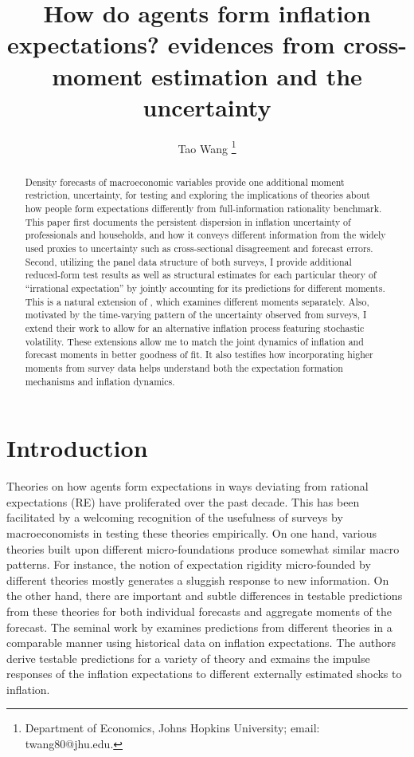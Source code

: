 \documentclass[12pt]{article}
\title{How do agents form inflation expectations? evidences from cross-moment estimation and the uncertainty}
\author{Tao Wang \footnote{Department of Economics, Johns Hopkins University; email: twang80@jhu.edu. }}
\begin{document}
	
	\maketitle
	
	\begin{abstract}
	Density forecasts of macroeconomic variables provide one additional moment restriction, uncertainty, for testing and exploring the implications of theories about how people form expectations differently from full-information rationality benchmark. This paper first documents the persistent dispersion in inflation uncertainty of professionals and households, and how it conveys different information from the widely used proxies to uncertainty such as cross-sectional disagreement and forecast errors. Second, utilizing the panel data structure of both surveys, I provide additional reduced-form test results as well as structural estimates for each particular theory of ``irrational expectation'' by jointly accounting for its predictions for different moments. This is a natural extension of \citet{coibion2012can}, which examines different moments separately. Also, motivated by the time-varying pattern of the uncertainty observed from surveys, I extend their work to allow for an alternative inflation process featuring stochastic volatility. These extensions allow me to match the joint dynamics of inflation and forecast moments in better goodness of fit. It also testifies how incorporating higher moments from survey data helps understand both the expectation formation mechanisms and inflation dynamics.   
	\end{abstract}
	
	\newpage 
	
	\section{Introduction}
	
	
	
	Theories on how agents form expectations in ways deviating from rational expectations (RE) have proliferated over the past decade. This has been facilitated by a welcoming recognition of the usefulness of surveys by macroeconomists in testing these theories empirically. On one hand, various theories built upon different micro-foundations produce somewhat similar macro patterns. For instance, the notion of expectation rigidity micro-founded by different theories mostly generates a sluggish response to new information. On the other hand, there are important and subtle differences in testable predictions from these theories for both individual forecasts and aggregate moments of the forecast.  The seminal work by \cite{coibion2012can} examines predictions from different theories in a comparable manner using historical data on inflation expectations. The authors derive testable predictions for a variety of theory and exmains the impulse responses of the inflation expectations to different externally estimated shocks to inflation. 
	
\end{document}
